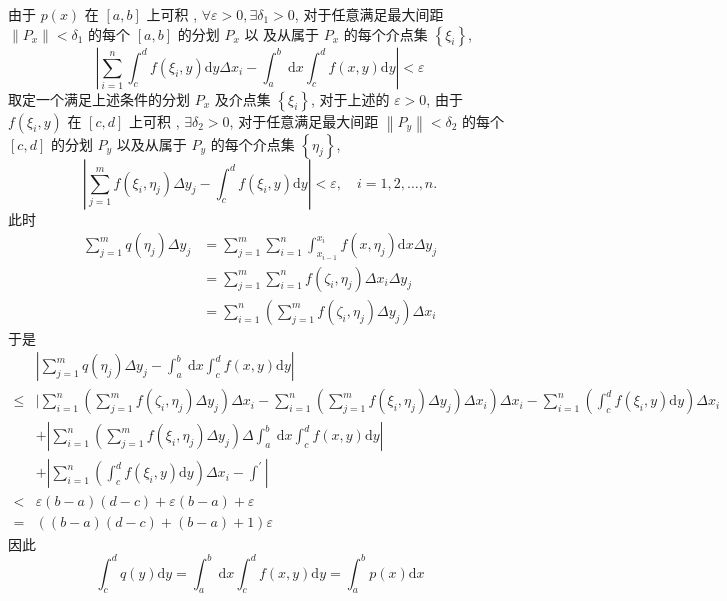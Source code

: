 \documentclass[10pt]{article}
\begin{document}
 由于  $p(x)$  在  $[a, b]$  上可积 , $\forall \varepsilon>0, \exists \delta_{1}>0$,  对于任意满足最大间距  $\left\|P_{x}\right\|<\delta_{1}$  的每个  $[a, b]$  的分划  $P_{x}$  以   及从属于  $P_{x}$  的每个介点集  $\left\{\xi_{i}\right\}$,
$$
\left|\sum_{i=1}^{n} \int_{c}^{d} f\left(\xi_{i}, y\right) \mathrm{d} y \Delta x_{i}-\int_{a}^{b} \mathrm{~d} x \int_{c}^{d} f(x, y) \mathrm{d} y\right|<\varepsilon
$$
 取定一个满足上述条件的分划  $P_{x}$  及介点集  $\left\{\xi_{i}\right\}$,  对于上述的  $\varepsilon>0$,  由于  $f\left(\xi_{i}, y\right)$  在  $[c, d]$  上可积 , $\exists \delta_{2}>0$,  对于任意满足最大间距  $\left\|P_{y}\right\|<\delta_{2}$  的每个  $[c, d]$  的分划  $P_{y}$  以及从属于  $P_{y}$  的每个介点集  $\left\{\eta_{j}\right\}$,
$$
\left|\sum_{j=1}^{m} f\left(\xi_{i}, \eta_{j}\right) \Delta y_{j}-\int_{c}^{d} f\left(\xi_{i}, y\right) \mathrm{d} y\right|<\varepsilon, \quad i=1,2, \ldots, n .
$$
 此时 
$$
\begin{aligned}
\sum_{j=1}^{m} q\left(\eta_{j}\right) \Delta y_{j} &=\sum_{j=1}^{m} \sum_{i=1}^{n} \int_{x_{i-1}}^{x_{i}} f\left(x, \eta_{j}\right) \mathrm{d} x \Delta y_{j} \\
&=\sum_{j=1}^{m} \sum_{i=1}^{n} f\left(\zeta_{i}, \eta_{j}\right) \Delta x_{i} \Delta y_{j} \\
&=\sum_{i=1}^{n}\left(\sum_{j=1}^{m} f\left(\zeta_{i}, \eta_{j}\right) \Delta y_{j}\right) \Delta x_{i}
\end{aligned}
$$
 于是 
$$
\begin{aligned}
&\left|\sum_{j=1}^{m} q\left(\eta_{j}\right) \Delta y_{j}-\int_{a}^{b} \mathrm{~d} x \int_{c}^{d} f(x, y) \mathrm{d} y\right| \\
\leqslant &\left.\mid \sum_{i=1}^{n}\left(\sum_{j=1}^{m} f\left(\zeta_{i}, \eta_{j}\right) \Delta y_{j}\right) \Delta x_{i}-\sum_{i=1}^{n}\left(\sum_{j=1}^{m} f\left(\xi_{i}, \eta_{j}\right) \Delta y_{j}\right) \Delta x_{i}\right) \Delta x_{i}-\sum_{i=1}^{n}\left(\int_{c}^{d} f\left(\xi_{i}, y\right) \mathrm{d} y\right) \Delta x_{i} \\
&+\left|\sum_{i=1}^{n}\left(\sum_{j=1}^{m} f\left(\xi_{i}, \eta_{j}\right) \Delta y_{j}\right) \Delta \int_{a}^{b} \mathrm{~d} x \int_{c}^{d} f(x, y) \mathrm{d} y\right| \\
&+\left|\sum_{i=1}^{n}\left(\int_{c}^{d} f\left(\xi_{i}, y\right) \mathrm{d} y\right) \Delta x_{i}-\int^{\prime}\right| \\
<& \varepsilon(b-a)(d-c)+\varepsilon(b-a)+\varepsilon \\
=&((b-a)(d-c)+(b-a)+1) \varepsilon
\end{aligned}
$$
 因此 
$$
\int_{c}^{d} q(y) \mathrm{d} y=\int_{a}^{b} \mathrm{~d} x \int_{c}^{d} f(x, y) \mathrm{d} y=\int_{a}^{b} p(x) \mathrm{d} x
$$
\end{document}
